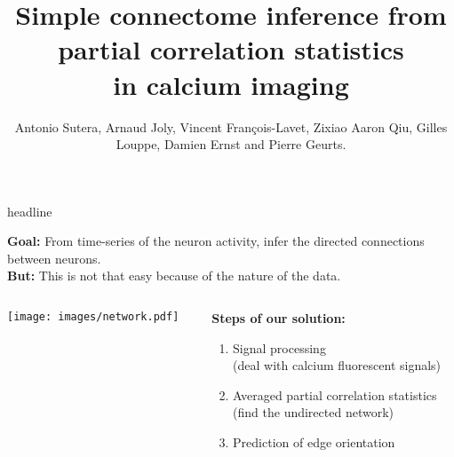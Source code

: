 \documentclass[final]{beamer}
\title{Simple connectome inference from partial correlation statistics\\in calcium imaging}
\author{{\footnotesize Antonio Sutera, Arnaud Joly, Vincent François-Lavet, Zixiao Aaron Qiu, Gilles Louppe, Damien Ernst and Pierre Geurts.}}
\date{}
\begin{document}

\begin{frame}

  \begin{beamercolorbox}[wd=\paperwidth, ignorebg]{headline}
    \begin{center}
      
    \end{center}
  \end{beamercolorbox}

\textbf{{\color{i6blue}Goal:}} From time-series of the neuron activity, infer the directed connections between neurons.\\[1.5ex]
\textbf{{\color{red}But:}} This is not that easy because of the nature of the data.\\[1.5ex]

\begin{columns}
\begin{column}{0.55\linewidth}
\texttt{[image: images/network.pdf]}
\end{column}
\begin{column}{0.5\linewidth}

\textbf{{\color{i6blue} Steps of our solution:}}
\begin{enumerate}[1.]
\item Signal processing\\{\scriptsize(deal with calcium fluorescent signals)}
\item Averaged partial correlation statistics\\{\scriptsize(find the undirected network)}
\item Prediction of edge orientation
\end{enumerate}


\end{column}
\end{columns}


\end{frame}
\end{document}
